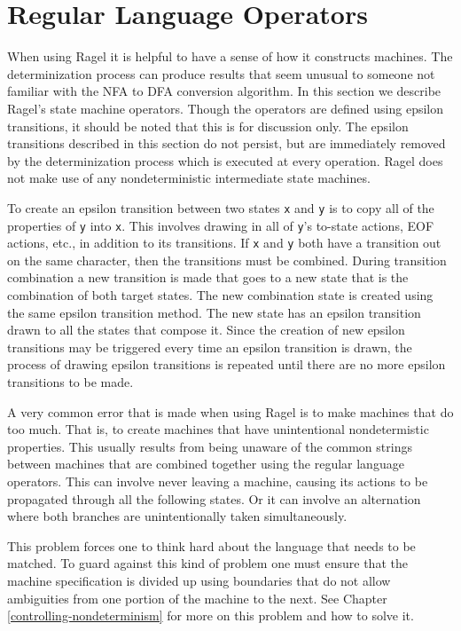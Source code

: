 \documentclass[letterpaper,11pt,oneside]{book}
\begin{document}
\section{Regular Language Operators}
\label{machconst}

When using Ragel it is helpful to have a sense of how it constructs machines.
The determinization process can produce results that seem unusual to someone
not familiar with the NFA to DFA conversion algorithm. In this section we
describe Ragel's state machine operators. Though the operators are defined
using epsilon transitions, it should be noted that this is for discussion only.
The epsilon transitions described in this section do not persist, but are
immediately removed by the determinization process which is executed at every
operation. Ragel does not make use of any nondeterministic intermediate state
machines. 

To create an epsilon transition between two states \verb|x| and \verb|y| is to
copy all of the properties of \verb|y| into \verb|x|. This involves drawing in
all of \verb|y|'s to-state actions, EOF actions, etc., in addition to its
transitions. If \verb|x| and \verb|y| both have a transition out on the same
character, then the transitions must be combined.  During transition
combination a new transition is made that goes to a new state that is the
combination of both target states. The new combination state is created using
the same epsilon transition method.  The new state has an epsilon transition
drawn to all the states that compose it. Since the creation of new epsilon
transitions may be triggered every time an epsilon transition is drawn, the
process of drawing epsilon transitions is repeated until there are no more
epsilon transitions to be made.

A very common error that is made when using Ragel is to make machines that do
too much. That is, to create machines that have unintentional
nondetermistic properties. This usually results from being unaware of the common strings
between machines that are combined together using the regular language
operators. This can involve never leaving a machine, causing its actions to be
propagated through all the following states. Or it can involve an alternation
where both branches are unintentionally taken simultaneously.

This problem forces one to think hard about the language that needs to be
matched. To guard against this kind of problem one must ensure that the machine
specification is divided up using boundaries that do not allow ambiguities from
one portion of the machine to the next. See Chapter
\ref{controlling-nondeterminism} for more on this problem and how to solve it.
\end{document}
